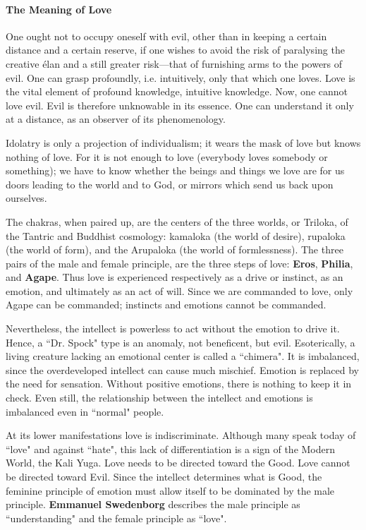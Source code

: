 \paragraph{The Meaning of Love}
\begin{quotex}
One ought not to occupy oneself with evil, other than in keeping a certain distance and a certain reserve, if one wishes to avoid the risk of paralysing the creative élan and a still greater risk—that of furnishing arms to the powers of evil. One can grasp profoundly, i.e. intuitively, only that which one loves. Love is the vital element of profound knowledge, intuitive knowledge. Now, one cannot love evil. Evil is therefore unknowable in its essence. One can understand it only at a distance, as an observer of its phenomenology. 

Idolatry is only a projection of individualism; it wears the mask of love but knows nothing of love. For it is not enough to love (everybody loves somebody or something); we have to know whether the beings and things we love are for us doors leading to the world and to God, or mirrors which send us back upon ourselves. 

\end{quotex}
The chakras, when paired up, are the centers of the three worlds, or Triloka, of the Tantric and Buddhist cosmology: kamaloka (the world of desire), rupaloka (the world of form), and the Arupaloka (the world of formlessness). The three pairs of the male and female principle, are the three steps of love: \textbf{Eros}, \textbf{Philia}, and \textbf{Agape}. Thus love is experienced respectively as a drive or instinct, as an emotion, and ultimately as an act of will. Since we are commanded to love, only Agape can be commanded; instincts and emotions cannot be commanded.

Nevertheless, the intellect is powerless to act without the emotion to drive it. Hence, a ``Dr. Spock" type is an anomaly, not beneficent, but evil. Esoterically, a living creature lacking an emotional center is called a ``chimera". It is imbalanced, since the overdeveloped intellect can cause much mischief. Emotion is replaced by the need for sensation. Without positive emotions, there is nothing to keep it in check. Even still, the relationship between the intellect and emotions is imbalanced even in ``normal" people.

At its lower manifestations love is indiscriminate. Although many speak today of ``love" and against ``hate", this lack of differentiation is a sign of the Modern World, the Kali Yuga. Love needs to be directed toward the Good. Love cannot be directed toward Evil. Since the intellect determines what is Good, the feminine principle of emotion must allow itself to be dominated by the male principle. \textbf{Emmanuel Swedenborg} describes the male principle as ``understanding" and the female principle as ``love".

